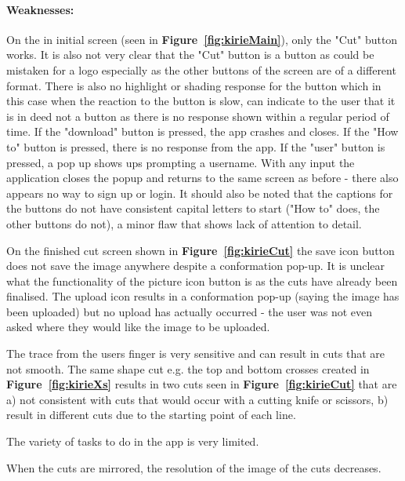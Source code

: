 \documentclass[11pt]{article}
\begin{document}
                
                \paragraph{Weaknesses:}
                On the in initial screen (seen in \textbf{Figure~\ref{fig:kirieMain}}), only the "Cut" button works. It is also not very clear that the "Cut" button is a button as could be  mistaken for a logo especially as the other buttons of the screen are of a different format. There is also no highlight or shading response for the button which in this case when the reaction to the button is slow, can indicate to the user that it is in deed not a button as there is no response shown within a regular period of time. If the "download" button is pressed, the app crashes and closes. If the "How to" button is pressed, there is no response from the app. If the "user" button is pressed, a pop up shows ups prompting a username. With any input the application closes the popup and returns to the same screen as before - there also appears no way to sign up or login. It should also be noted that the captions for the buttons do not have consistent capital letters to start ("How to" does, the other buttons do not), a minor flaw that shows lack of attention to detail.
                
                On the finished cut screen shown in \textbf{Figure~\ref{fig:kirieCut}} the save icon button does not save the image anywhere despite a conformation pop-up. It is unclear what the functionality of the picture icon button is as the cuts have already been finalised. The upload icon results in a conformation pop-up (saying the image has been uploaded) but no upload has actually occurred - the user was not even asked where they would like the image to be uploaded. 
                
                The trace from the users finger is very sensitive and can result in cuts that are not smooth. The same shape cut e.g. the top and bottom crosses created in \textbf{Figure~\ref{fig:kirieXs}} results in two cuts seen in \textbf{Figure~\ref{fig:kirieCut}} that are a) not consistent with cuts that would occur with a cutting knife or scissors, b) result in different cuts due to the starting point of each line. 
                
                The variety of tasks to do in the app is very limited.
                
                When the cuts are mirrored, the resolution of the image of the cuts decreases.
                
\end{document}
